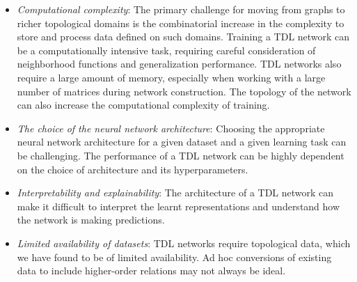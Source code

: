 \documentclass[
  12pt,
]{krantz}
\providecommand{\tightlist}{%
  \setlength{\itemsep}{0pt}\setlength{\parskip}{0pt}}
\begin{document}
\begin{itemize}
\tightlist
\item
  \emph{Computational complexity}: The primary challenge for moving from
  graphs to richer topological domains is the combinatorial increase in
  the complexity to store and process data defined on such domains.
  Training a TDL network can be a computationally intensive task,
  requiring careful consideration of neighborhood functions and
  generalization performance. TDL networks also require a large amount
  of memory, especially when working with a large number of matrices
  during network construction. The topology of the network can also
  increase the computational complexity of training.
\item
  \emph{The choice of the neural network architecture}: Choosing the
  appropriate neural network architecture for a given dataset and a
  given learning task can be challenging. The performance of a TDL
  network can be highly dependent on the choice of architecture and its
  hyperparameters.
\item
  \emph{Interpretability and explainability}: The architecture of a TDL
  network can make it difficult to interpret the learnt representations
  and understand how the network is making predictions.
\item
  \emph{Limited availability of datasets}: TDL networks require
  topological data, which we have found to be of limited availability.
  Ad hoc conversions of existing data to include higher-order relations
  may not always be ideal.
\end{itemize}
\end{document}
